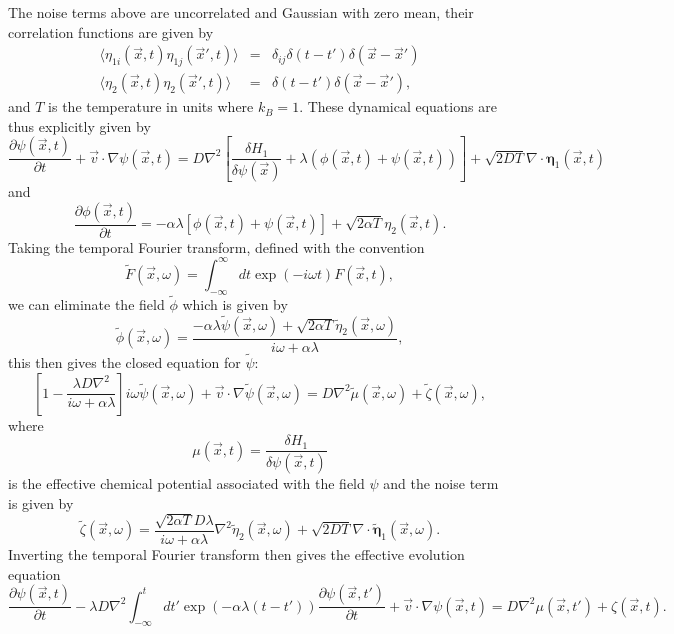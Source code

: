 The noise terms above 
are uncorrelated and Gaussian with zero mean, their correlation functions are given by
\begin{eqnarray}
\langle \eta_{1i}(\vec{x},t) \eta_{1j}(\vec{x}',t)\rangle&=& \delta_{ij}\delta(t-t') \delta(\vec{x}-\vec{x}') \\
\langle \eta_{2}(\vec{x},t) \eta_{2}(\vec{x}',t)\rangle&=& \delta(t-t') \delta(\vec{x}-\vec{x}') ,
\end{eqnarray}
and $T$ is the temperature in units where $k_B=1$.
These dynamical equations  are thus explicitly given by
\begin{equation}
\frac{\partial \psi(\vec{x},t)}{\partial t} +\vec{v}\cdot { \nabla}\psi(\vec{x},t)= D\nabla^2[\frac{\delta H_1}{\delta \psi(\vec{x})}+\lambda(\phi(\vec{x},t) + \psi(\vec{x},t))]+ \sqrt{2D T}\nabla \cdot {\boldsymbol \eta}_1(\vec{x},t)
\end{equation}
and
\begin{equation}
\frac{\partial \phi(\vec{x},t)}{\partial t} = -\alpha\lambda[\phi(\vec{x},t) + \psi(\vec{x},t)]+ \sqrt{2\alpha T}{ \eta}_2(\vec{x},t).
\end{equation}
Taking the temporal Fourier transform, defined with the convention
\begin{equation}
\tilde F(\vec{x}, \omega) = \int_{-\infty}^\infty dt \exp(-i\omega t)F(\vec{x}, t),
\end{equation}
we can eliminate the field $\tilde \phi$ which is given by
\begin{equation}
\tilde \phi(\vec{x},\omega) = \frac{-\alpha\lambda \tilde \psi(\vec{x},\omega)+\sqrt{2\alpha T}\tilde \eta_2(\vec{x},\omega)}{i\omega +\alpha \lambda},
\end{equation}
this then gives the closed equation for $\tilde \psi$:
\begin{equation}
\left[1-\frac{\lambda D \nabla^2}{i\omega+\alpha\lambda}\right]i\omega \tilde\psi(\vec{x}, \omega) +\vec{v}\cdot\nabla\tilde\psi(\vec{x}, \omega)
= D\nabla^2 \tilde \mu(\vec{x},\omega) +  \tilde \zeta(\vec{x},\omega),
\end{equation}
where 
\begin{equation}
\mu(\vec{x},t)=\frac{\delta H_1}{\delta \psi(\vec{x},t)}
\end{equation}
is the effective chemical potential associated with the field $\psi$ and the noise term is given by
\begin{equation}
\tilde \zeta(\vec{x},\omega) = \frac{\sqrt{2\alpha T}D\lambda}{i\omega + \alpha\lambda}\nabla^2\tilde \eta_2(\vec{x},\omega) +
\sqrt{2DT}\nabla\cdot\tilde {\bm \eta}_1(\vec{x},\omega).
\end{equation}
Inverting the temporal Fourier transform then gives the effective evolution equation
\begin{equation}
\frac{\partial \psi(\vec{x},t)}{\partial t} -\lambda D\nabla^2\int_{-\infty}^t dt'
\exp(-\alpha\lambda(t-t')) \frac{\partial \psi(\vec{x},t')}{\partial t}+\vec{v}\cdot\nabla\psi(\vec{x}, t)=D\nabla^2  \mu(\vec{x},t') +  \zeta(\vec{x},t).\label{dyn1}
\end{equation}
